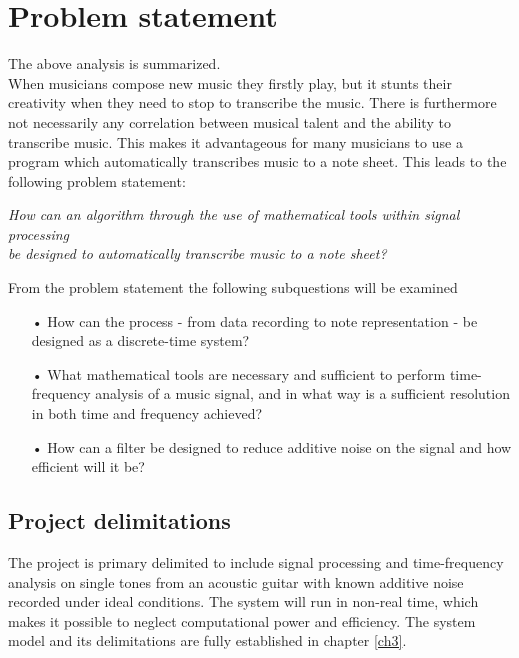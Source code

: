 \section{Problem statement}
The above analysis is summarized.\\
When musicians compose new music they firstly play, but it stunts their creativity when they need to stop to transcribe the music. There is furthermore not necessarily any correlation between musical talent and the ability to transcribe music. This makes it advantageous for many musicians to use a program which automatically transcribes music to a note sheet. This leads to the following problem statement:

\begin{center}
\textit{How can an algorithm through the use of mathematical tools within signal processing  \\
be designed to automatically transcribe music to a note sheet?}
\end{center}

From the problem statement the following subquestions will be examined 
\begin{itemize}
\item[•] How can the process - from data recording to note representation - be designed as a discrete-time system?
\item[•] What mathematical tools are necessary and sufficient to perform time-frequency analysis of a music signal, and in what way is a sufficient resolution in both time and frequency achieved?   
\item[•] How can a filter be designed to reduce additive noise on the signal and how efficient will it be? 
\end{itemize}

\subsection{Project delimitations}
The project is primary delimited to include signal processing and time-frequency analysis on single tones from an acoustic guitar with known additive noise recorded under ideal conditions. The system will run in non-real time, which makes it possible to neglect computational power and efficiency. The system model and its delimitations are fully established in chapter \ref{ch3}.




